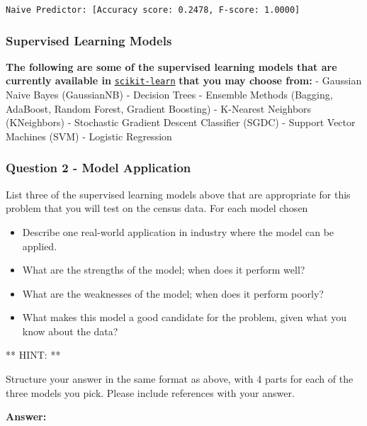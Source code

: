 \documentclass[11pt]{article}
\providecommand{\tightlist}{%
      \setlength{\itemsep}{0pt}\setlength{\parskip}{0pt}}
\begin{document}
    \begin{Verbatim}[commandchars=\\\{\}]
Naive Predictor: [Accuracy score: 0.2478, F-score: 1.0000]

    \end{Verbatim}

    \subsubsection{Supervised Learning
Models}\label{supervised-learning-models}

\textbf{The following are some of the supervised learning models that
are currently available in}
\href{http://scikit-learn.org/stable/supervised_learning.html}{\texttt{scikit-learn}}
\textbf{that you may choose from:} - Gaussian Naive Bayes (GaussianNB) -
Decision Trees - Ensemble Methods (Bagging, AdaBoost, Random Forest,
Gradient Boosting) - K-Nearest Neighbors (KNeighbors) - Stochastic
Gradient Descent Classifier (SGDC) - Support Vector Machines (SVM) -
Logistic Regression

    \subsubsection{Question 2 - Model
Application}\label{question-2---model-application}

List three of the supervised learning models above that are appropriate
for this problem that you will test on the census data. For each model
chosen

\begin{itemize}
\tightlist
\item
  Describe one real-world application in industry where the model can be
  applied.
\item
  What are the strengths of the model; when does it perform well?
\item
  What are the weaknesses of the model; when does it perform poorly?
\item
  What makes this model a good candidate for the problem, given what you
  know about the data?
\end{itemize}

** HINT: **

Structure your answer in the same format as above, with 4 parts for each
of the three models you pick. Please include references with your
answer.

    \textbf{Answer: }
\end{document}
